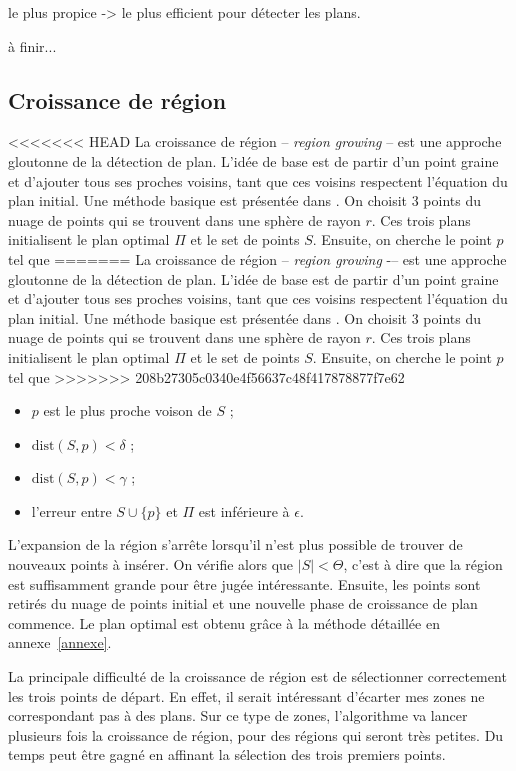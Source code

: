 ﻿\documentclass[12pt, twoside]{article}
\begin{document}
le plus propice -> le plus efficient pour détecter les plans.

à finir...

\subsection{Croissance de région}
<<<<<<< HEAD
La croissance de région -- \textit{region growing} -- est une approche gloutonne de la détection de plan. L’idée de base est de partir d’un point graine et d’ajouter tous ses proches voisins, tant que ces voisins respectent l’équation du plan initial. Une méthode basique est présentée dans \cite{reggrow1}. On choisit 3 points du nuage de points qui se trouvent dans une sphère de rayon $r$. Ces trois plans initialisent le plan optimal $\Pi$ et le set de points $S$. Ensuite, on cherche le point $p$ tel que
=======
La croissance de région -- \textit{region growing} -– est une approche gloutonne de la détection de plan. L’idée de base est de partir d’un point graine et d’ajouter tous ses proches voisins, tant que ces voisins respectent l’équation du plan initial. Une méthode basique est présentée dans \cite{reggrow1}. On choisit 3 points du nuage de points qui se trouvent dans une sphère de rayon $r$. Ces trois plans initialisent le plan optimal $\Pi$ et le set de points $S$. Ensuite, on cherche le point $p$ tel que
>>>>>>> 208b27305c0340e4f56637c48f417878877f7e62
\begin{itemize}
  \item $p$ est le plus proche voison de $S$ ;
  \item $\text{dist}(S,p) < \delta$ ;
  \item $\text{dist}(S,p) < \gamma$ ;
  \item l'erreur entre $S\cup\{p\}$ et $\Pi$ est inférieure à $\epsilon$.
\end{itemize}

L'expansion de la région s'arrête lorsqu'il n'est plus possible de trouver de nouveaux points à insérer. On vérifie alors que $\vert S\vert < \Theta$, c'est à dire que la région est suffisamment grande pour être jugée intéressante. Ensuite, les points sont retirés du nuage de points initial et une nouvelle phase de croissance de plan commence. Le plan optimal est obtenu grâce à la méthode détaillée en annexe~\ref{annexe}.

La principale difficulté de la croissance de région est de sélectionner correctement les trois points de départ. En effet, il serait intéressant d'écarter mes zones ne correspondant pas à des plans. Sur ce type de zones, l'algorithme va lancer plusieurs fois la croissance de région, pour des régions qui seront très petites. Du temps peut être gagné en affinant la sélection des trois premiers points.
\end{document}
